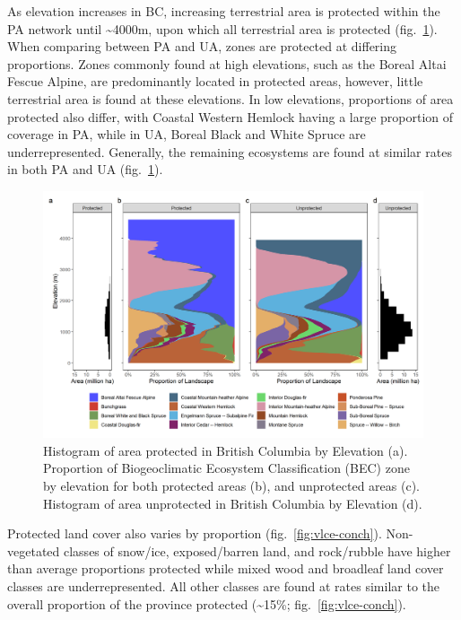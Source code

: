 \documentclass[11pt]{article}
\makeatletter
\def\maxwidth{\ifdim\Gin@nat@width>\linewidth\linewidth
\else\Gin@nat@width\fi}
\let\Oldincludegraphics\includegraphics
\renewcommand{\includegraphics}[1]{\Oldincludegraphics[width=\maxwidth]{#1}}
\makeatother
\begin{document}
As elevation increases in BC, increasing terrestrial area is protected
within the PA network until \textasciitilde4000m, upon which all
terrestrial area is protected (fig.~\ref{fig:bec-elev}). When comparing
between PA and UA, zones are protected at differing proportions. Zones
commonly found at high elevations, such as the Boreal Altai Fescue
Alpine, are predominantly located in protected areas, however, little
terrestrial area is found at these elevations. In low elevations,
proportions of area protected also differ, with Coastal Western Hemlock
having a large proportion of coverage in PA, while in UA, Boreal Black
and White Spruce are underrepresented. Generally, the remaining
ecosystems are found at similar rates in both PA and UA
(fig.~\ref{fig:bec-elev}).

\begin{figure}
\hypertarget{fig:bec-elev}{%
\centering
\includegraphics{figures/bec_elev_hist.png}
\caption{Histogram of area protected in British Columbia by Elevation
(a). Proportion of Biogeoclimatic Ecosystem Classification (BEC) zone by
elevation for both protected areas (b), and unprotected areas (c).
Histogram of area unprotected in British Columbia by Elevation
(d).}\label{fig:bec-elev}
}
\end{figure}

Protected land cover also varies by proportion
(fig.~\ref{fig:vlce-conch}). Non-vegetated classes of snow/ice,
exposed/barren land, and rock/rubble have higher than average
proportions protected while mixed wood and broadleaf land cover classes
are underrepresented. All other classes are found at rates similar to
the overall proportion of the province protected (\textasciitilde15\%;
fig.~\ref{fig:vlce-conch}).
\end{document}
